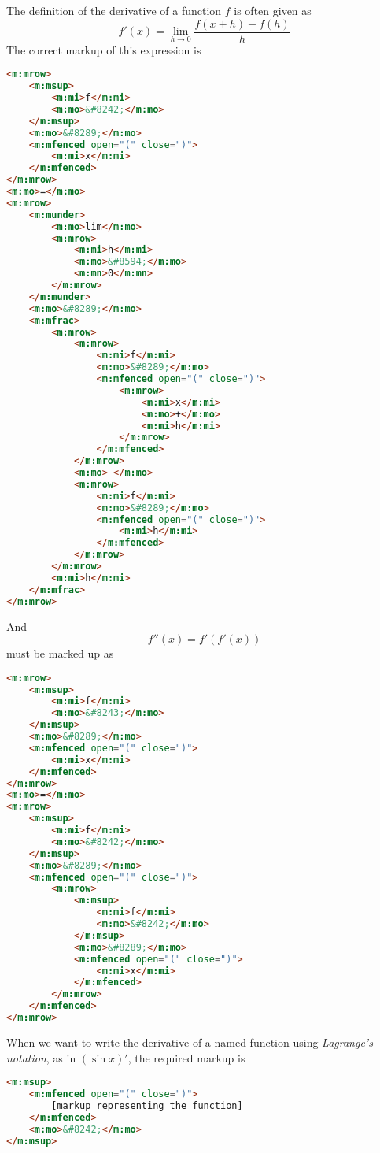 \documentclass[english,a4paper,11pt]{article}
\begin{document}
\begin{eksempler}
The definition of the derivative of a function $f$ is often given as
\begin{equation}
f'(x) = \lim_{h \rightarrow 0} \frac{f(x+h) - f(h)}{h}
\end{equation}
The correct markup of this expression is 
\begin{lstlisting}[language=HTML]
<m:mrow>
	<m:msup>
		<m:mi>f</m:mi>
		<m:mo>&#8242;</m:mo>
	</m:msup>
	<m:mo>&#8289;</m:mo>
	<m:mfenced open="(" close=")">
		<m:mi>x</m:mi>
	</m:mfenced>
</m:mrow>
<m:mo>=</m:mo>
<m:mrow>
	<m:munder>
		<m:mo>lim</m:mo>
		<m:mrow>
			<m:mi>h</m:mi>
			<m:mo>&#8594;</m:mo>
			<m:mn>0</m:mn>
		</m:mrow>
	</m:munder>
	<m:mo>&#8289;</m:mo>
	<m:mfrac>
		<m:mrow>
			<m:mrow>
				<m:mi>f</m:mi>
				<m:mo>&#8289;</m:mo>
				<m:mfenced open="(" close=")">
					<m:mrow>
						<m:mi>x</m:mi>
						<m:mo>+</m:mo>
						<m:mi>h</m:mi>
					</m:mrow>
				</m:mfenced>
			</m:mrow>
			<m:mo>-</m:mo>
			<m:mrow>
				<m:mi>f</m:mi>
				<m:mo>&#8289;</m:mo>
				<m:mfenced open="(" close=")">
					<m:mi>h</m:mi>
				</m:mfenced>
			</m:mrow>
		</m:mrow>
		<m:mi>h</m:mi>
	</m:mfrac>
</m:mrow>
\end{lstlisting}
And
\begin{equation}
f''(x) = f'(f'(x))
\end{equation}
must be marked up as
\begin{lstlisting}[language=HTML]
<m:mrow>
	<m:msup>
		<m:mi>f</m:mi>
		<m:mo>&#8243;</m:mo>
	</m:msup>
	<m:mo>&#8289;</m:mo>
	<m:mfenced open="(" close=")">
		<m:mi>x</m:mi>
	</m:mfenced>
</m:mrow>
<m:mo>=</m:mo>
<m:mrow>
	<m:msup>
		<m:mi>f</m:mi>
		<m:mo>&#8242;</m:mo>
	</m:msup>
	<m:mo>&#8289;</m:mo>
	<m:mfenced open="(" close=")">
		<m:mrow>
			<m:msup>
				<m:mi>f</m:mi>
				<m:mo>&#8242;</m:mo>
			</m:msup>
			<m:mo>&#8289;</m:mo>
			<m:mfenced open="(" close=")">
				<m:mi>x</m:mi>
			</m:mfenced>
		</m:mrow>
	</m:mfenced>
</m:mrow>
\end{lstlisting}

\end{eksempler}

\bigskip
When we want to write the derivative of a named function using \emph{Lagrange's notation}, as in $(\sin x)'$, the required markup is

\begin{lstlisting}[language=HTML]
<m:msup>
	<m:mfenced open="(" close=")">
		[markup representing the function]
	</m:mfenced>
	<m:mo>&#8242;</m:mo>
</m:msup>
\end{lstlisting}
\end{document}
